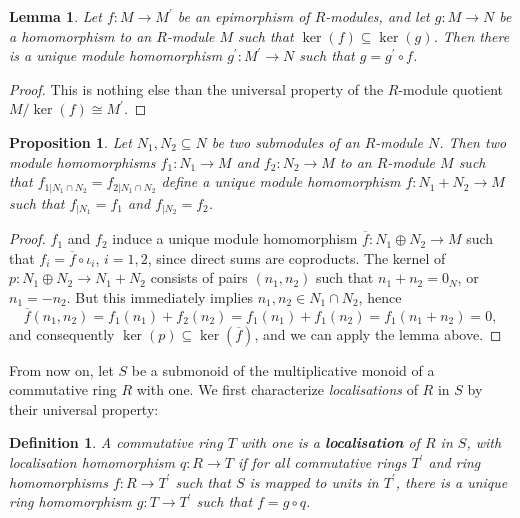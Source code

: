 \documentclass{amsart}
\theoremstyle{plain}
\numberwithin{equation}{section} %
\numberwithin{figure}{section} %
\theoremstyle{plain}
\theoremstyle{plain}
\theoremstyle{plain}
\theoremstyle{plain}
\newtheorem{lem}[thm]{Lemma} %
\theoremstyle{plain}
\newtheorem{prop}[thm]{Proposition} %
\theoremstyle{plain}
\newtheorem{Def}[thm]{Definition} %
\theoremstyle{remark}
\theoremstyle{remark}
\theoremstyle{remark}
\begin{document}
\begin{lem}
Let $f: M \rightarrow M^\prime$ be an epimorphism of $R$-modules, and let $g: M \rightarrow N$ be a homomorphism to an $R$-module $M$ such that $\ker(f) \subseteq \ker(g)$. Then there is a unique module homomorphism $g^\prime: M^\prime \rightarrow N$ such that $g = g^\prime \circ f$.
\end{lem}
\begin{proof}
This is nothing else than the universal property of the $R$-module quotient $M/\ker(f) \cong M^\prime$.
\end{proof}

\begin{prop} \label{map-sum-prop}
Let $N_1, N_2 \subseteq N$ be two submodules of an $R$-module $N$. Then two module homomorphisms $f_1: N_1 \rightarrow M$ and $f_2: N_2 \rightarrow M$ to an $R$-module $M$ such that $f_{1|N_1 \cap N_2} = f_{2|N_1 \cap N_2}$ define a unique module homomorphism $f: N_1 + N_2 \rightarrow M$ such that $f_{|N_1} = f_1$ and $f_{|N_2} = f_2$.
\end{prop}
\begin{proof}
$f_1$ and $f_2$ induce a unique module homomorphism $\overline{f}: N_1 \oplus N_2 \rightarrow M$ such that $f_i = \overline{f} \circ \iota_i$, $i = 1, 2$, since direct sums are coproducts. The kernel of $p: N_1 \oplus N_2 \rightarrow N_1 + N_2$ consists of pairs $(n_1, n_2)$ such that $n_1 + n_2 = 0_N$, or $n_1 = -n_2$. But this immediately implies $n_1, n_2 \in N_1 \cap N_2$, hence 
\[ \overline{f}(n_1, n_2) = f_1(n_1) + f_2(n_2) = f_1(n_1) + f_1(n_2) = f_1(n_1 + n_2) = 0, \]
and consequently $\ker(p) \subseteq \ker(\overline{f})$, and we can apply the lemma above. 
\end{proof}

From now on, let $S$ be a submonoid of the multiplicative monoid of a commutative ring $R$ with one. We first characterize \textit{localisations} of $R$ in $S$ by their universal property:
\begin{Def}
A commutative ring $T$ with one is a \textbf{localisation} of $R$ in $S$, with localisation homomorphism $q : R \rightarrow T$ if for all commutative rings $T^\prime$ and ring homomorphisms $f : R \rightarrow T^\prime$ such that $S$ is mapped to units in $T^\prime$, there is a unique ring homomorphism $g : T \rightarrow T^\prime$ such that $f = g \circ q$.
\end{Def}
\end{document}
